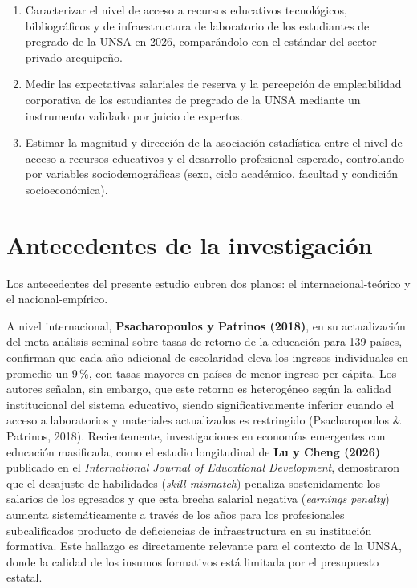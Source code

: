 \documentclass[11pt, a4paper]{article}
\begin{document}
\begin{enumerate}
    \item Caracterizar el nivel de acceso a recursos educativos tecnológicos, bibliográficos y de infraestructura de laboratorio de los estudiantes de pregrado de la UNSA en 2026, comparándolo con el estándar del sector privado arequipeño.
    \item Medir las expectativas salariales de reserva y la percepción de empleabilidad corporativa de los estudiantes de pregrado de la UNSA mediante un instrumento validado por juicio de expertos.
    \item Estimar la magnitud y dirección de la asociación estadística entre el nivel de acceso a recursos educativos y el desarrollo profesional esperado, controlando por variables sociodemográficas (sexo, ciclo académico, facultad y condición socioeconómica).
\end{enumerate}

\section{Antecedentes de la investigación}

Los antecedentes del presente estudio cubren dos planos: el internacional-teórico y el nacional-empírico.

A nivel internacional, \textbf{Psacharopoulos y Patrinos (2018)}, en su actualización del meta-análisis seminal sobre tasas de retorno de la educación para 139 países, confirman que cada año adicional de escolaridad eleva los ingresos individuales en promedio un 9\,\%, con tasas mayores en países de menor ingreso per cápita. Los autores señalan, sin embargo, que este retorno es heterogéneo según la calidad institucional del sistema educativo, siendo significativamente inferior cuando el acceso a laboratorios y materiales actualizados es restringido (Psacharopoulos \& Patrinos, 2018). Recientemente, investigaciones en economías emergentes con educación masificada, como el estudio longitudinal de \textbf{Lu y Cheng (2026)} publicado en el \textit{International Journal of Educational Development}, demostraron que el desajuste de habilidades (\textit{skill mismatch}) penaliza sostenidamente los salarios de los egresados y que esta brecha salarial negativa (\textit{earnings penalty}) aumenta sistemáticamente a través de los años para los profesionales subcalificados producto de deficiencias de infraestructura en su institución formativa. Este hallazgo es directamente relevante para el contexto de la UNSA, donde la calidad de los insumos formativos está limitada por el presupuesto estatal.
\end{document}
